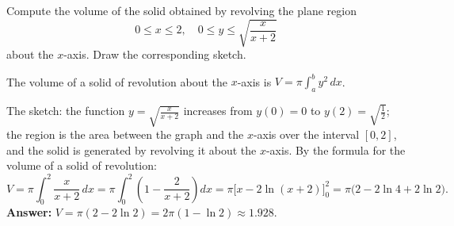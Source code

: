 
\begin{question}
Compute the volume of the solid obtained by revolving the plane region
\[ 0\le x\le2,\quad 0\le y\le\sqrt{\frac{x}{x+2}} \]
about the $x$-axis. Draw the corresponding sketch.
\end{question}

\begin{hint}
The volume of a solid of revolution about the $x$-axis is $V=\pi\int_a^b y^2\,dx$.
\end{hint}

\begin{solution}
The sketch: the function $y=\sqrt{\frac{x}{x+2}}$ increases from $y(0)=0$ to $y(2)=\sqrt{\frac12}$; the region is the area between the graph and the $x$-axis over the interval $[0,2]$, and the solid is generated by revolving it about the $x$-axis. By the formula for the volume of a solid of revolution:
\[ V=\pi\int_0^2\frac{x}{x+2}\,dx=\pi\int_0^2\left(1-\frac{2}{x+2}\right)dx=\pi\Big[x-2\ln(x+2)\Big]_0^2=\pi\big(2-2\ln4+2\ln2\big). \]
\textbf{Answer:} $V=\pi(2-2\ln2)=2\pi(1-\ln2)\approx1.928$.
\end{solution}
